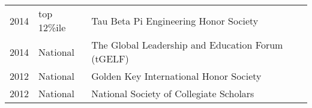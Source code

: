 \documentclass[]{deedy-resume-openfont}
\begin{document}
\begin{minipage}[t]{0.66\textwidth}
\begin{tabular}{rll}
2014 	& top 12\%ile    & Tau Beta Pi Engineering Honor Society\\
2014   & National   & The Global Leadership and Education Forum (tGELF)\\
2012   &  National  & Golden Key International Honor Society\\
2012   &  National   & National Society of Collegiate Scholars\\
\end{tabular}
\sectionsep

\end{minipage} 
\end{document}
